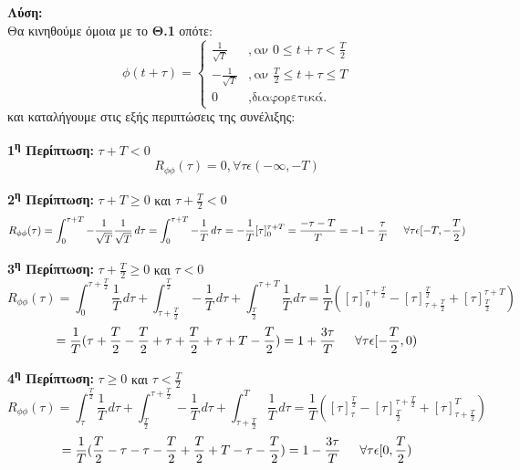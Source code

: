 \begin{justify}
\textbf{Λύση:}\\
Θα κινηθούμε όμοια με το {\bf Θ.1} οπότε:
\[
\phi(t+\tau)= 
\left\{
	\begin{array}{lll}
		\frac{1}{\sqrt{T}} &, \mbox{αν } 0 \leq t+\tau < \frac{T}{2} \\
        -\frac{1}{\sqrt{T}} &, \mbox{αν } \frac{T}{2} \leq t+\tau \leq T \\
		0 &, \mbox{διαφορετικά.}
	\end{array}
\right.
\]
και καταλήγουμε στις εξής περιπτώσεις της συνέλιξης:
\end{justify}

\begin{justify}
{\bf 1\textsuperscript{η} Περίπτωση:}  $\tau+T<0$
\[
R_{\phi\phi}(\tau)=0, \forall \tau \epsilon (-\infty,-T)      
\]
\end{justify}

\begin{justify}
{\bf 2\textsuperscript{η} Περίπτωση:}  $\tau+T\geq0$ και $\tau+\frac{T}{2}<0$
\[
R_{\phi\phi}(\tau)=\int_{0}^{\tau+T} -\frac{1}{\sqrt{T}}\frac{1}{\sqrt{T}}\,d\tau =
\int_{0}^{\tau+T} -\frac{1}{T}\,d\tau=
-\frac{1}{T}[\tau]_{0}^{\tau+T} =\frac{-\tau-T}{T}
=-1-\frac{\tau}{T} \hspace{1.5em} \forall\tau\epsilon[-T,-\frac{T}{2})
\]
\end{justify}

\begin{justify}
{\bf 3\textsuperscript{η} Περίπτωση:}  $\tau+\frac{T}{2}\geq0$ και $\tau<0$
\[
R_{\phi\phi}(\tau)=\int_{0}^{\tau+\frac{T}{2}}\frac{1}{T}\,d\tau+
\int_{\tau+\frac{T}{2}}^{\frac{T}{2}}-\frac{1}{T}\,d\tau+
\int_{\frac{T}{2}}^{\tau+T}\frac{1}{T}\,d\tau
=\frac{1}{T}([\tau]_{0}^{\tau+\frac{T}{2}}-[\tau]_{\tau+\frac{T}{2}}^{\frac{T}{2}}+
[\tau]_{\frac{T}{2}}^{\tau+T})
\]
\[
=\frac{1}{T}(\tau+\frac{T}{2}-\frac{T}{2}+\tau+\frac{T}{2}+\tau+T-\frac{T}{2})
=1+\frac{3\tau}{T}\hspace{1.5em} \forall\tau\epsilon[-\frac{T}{2},0)
\]
\end{justify}

\begin{justify}
{\bf 4\textsuperscript{η} Περίπτωση:}  $\tau\geq0$ και $\tau<\frac{T}{2}$
\[
R_{\phi\phi}(\tau)=\int_{\tau}^{\frac{T}{2}}\frac{1}{T}\,d\tau+
\int_{\frac{T}{2}}^{\tau+\frac{T}{2}}-\frac{1}{T}\,d\tau+
\int_{\tau+\frac{T}{2}}^{T}\frac{1}{T}\,d\tau
=\frac{1}{T}([\tau]_{\tau}^{\frac{T}{2}}-[\tau]_{\frac{T}{2}}^{\tau+\frac{T}{2}}+
[\tau]_{\tau+\frac{T}{2}}^{T})
\]
\[
=\frac{1}{T}(\frac{T}{2}-\tau-\tau-\frac{T}{2}+\frac{T}{2}+T-\tau-\frac{T}{2})
=1-\frac{3\tau}{T}\hspace{1.5em} \forall\tau\epsilon[0,\frac{T}{2})
\]
\end{justify}

